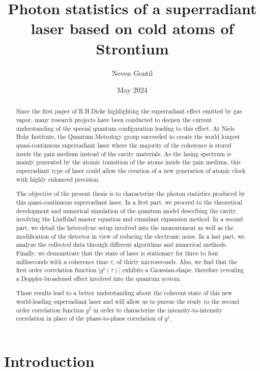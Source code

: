 \documentclass[11pt]{report}
\begin{document}
\title{Photon statistics of a superradiant laser based on cold atoms of Strontium}
\author{Neven Gentil}
\date{May 2024}
\maketitle

\tableofcontents

\begin{abstract}
Since the first paper of R.H.Dicke highlighting the superradiant effect emitted by gas vapor, many research projects have been conducted to deepen the current understanding of the special quantum configuration leading to this effect. At Niels Bohr Institute, the Quantum Metrology group succeeded to create the world longest quasi-continuous superradiant laser where the majority of the coherence is stored inside the gain medium instead of the cavity materials. As the lasing spectrum is mainly generated by the atomic transition of the atoms inside the gain medium, this superradiant type of laser could allow the creation of a new generation of atomic clock with highly enhanced precision. 

The objective of the present thesis is to characterize the photon statistics produced by this quasi-continuous superradiant laser. In a first part, we proceed to the theoretical development and numerical simulation of the quantum model describing the cavity, involving the Lindblad master equation and cumulant expansion method. In a second part, we detail the heterodyne setup involved into the measurement as well as the modification of the detector in view of reducing the electronic noise. In a last part, we analyze the collected data through different algorithms and numerical methods. Finally, we demonstrate that the state of laser is stationary for three to four milliseconds with a coherence time $\tau_c$ of thirty microseconds. Also, we find that the first order correlation function $\vert g^1(\tau) \vert$ exhibits a Gaussian-shape, therefore revealing a Doppler-broadened effect involved into the quantum system.

Those results lead to a better understanding about the coherent state of this new world-leading superradiant laser and will allow us to pursue the study to the second order correlation function $g^2$ in order to characterize the intensity-to-intensity correlation in place of the phase-to-phase correlation of $g^1$.
\end{abstract}

\chapter{Introduction}
\end{document}
